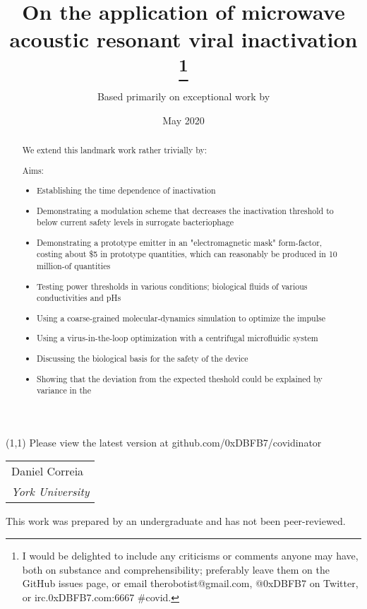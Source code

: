 \documentclass[fleqn,10pt]{article}
\title{On the application of microwave acoustic resonant viral inactivation
\thanks{I would be delighted to include any criticisms or comments anyone may have, both on substance and comprehensibility; preferably leave them on the GitHub issues page, or email therobotist@gmail.com, @0xDBFB7 on Twitter, or irc.0xDBFB7.com:6667 \#covid.}}
\date{May 2020}
\author{Based primarily on exceptional work by }
\begin{document}
\flushbottom 
\maketitle
\thispagestyle{empty}




\begin{textblock}{5}(1,1)
\noindent Please view the latest version at github.com/0xDBFB7/covidinator
\end{textblock}

\null\begin{tabular}[t]{l@{}}
  {Daniel Correia} \\
  \textit{York University}
\end{tabular}



\begin{abstract}

We extend this landmark work rather trivially by:


Aims:

\begin{itemize}
  \item Establishing the time dependence of inactivation
  \item Demonstrating a modulation scheme that decreases the inactivation threshold to below current safety levels in surrogate bacteriophage
  \item Demonstrating a prototype emitter in an "electromagnetic mask" form-factor, costing about \$5 in prototype quantities, which can reasonably be produced in 10 million-of quantities
  \item Testing power thresholds in various conditions; biological fluids of various conductivities and pHs
  \item Using a coarse-grained molecular-dynamics simulation to optimize the impulse
  \item Using a virus-in-the-loop optimization with a centrifugal microfluidic system
  \item Discussing the biological basis for the safety of the device
  \item Showing that the deviation from the expected theshold could be explained by variance in the 
\end{itemize}
\end{abstract}



This work was prepared by an undergraduate and has not been peer-reviewed. 
\end{document}
